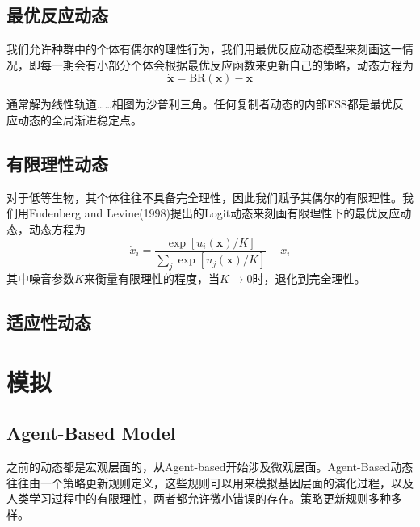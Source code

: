 \documentclass[lang=cn,12pt,a4paper]{elegantpaper}
\begin{document}
\subsection{最优反应动态}

我们允许种群中的个体有偶尔的理性行为，我们用最优反应动态模型来刻画这一情况，即每一期会有小部分个体会根据最优反应函数来更新自己的策略，动态方程为
\begin{equation}
\dot{\mathbf{x}}=\mathrm{BR}(\mathbf{x})-\mathbf{x}
\end{equation}

通常解为线性轨道……相图为沙普利三角。任何复制者动态的内部ESS都是最优反应动态的全局渐进稳定点。

\subsection{有限理性动态}

对于低等生物，其个体往往不具备完全理性，因此我们赋予其偶尔的有限理性。我们用Fudenberg and Levine(1998)提出的Logit动态来刻画有限理性下的最优反应动态，动态方程为
\begin{equation}
\dot{{x}}_{i}=\frac{\exp \left[u_{i}(\mathbf{x}) / K\right]}{\sum_{j} \exp \left[u_{j}(\mathbf{x}) / K\right]}-{x}_i
\end{equation}
其中噪音参数$K$来衡量有限理性的程度，当$K\rightarrow0$时，退化到完全理性。

\subsection{适应性动态}






\section{模拟}

\subsection{Agent-Based Model}

之前的动态都是宏观层面的，从Agent-based开始涉及微观层面。Agent-Based动态往往由一个策略更新规则定义，这些规则可以用来模拟基因层面的演化过程，以及人类学习过程中的有限理性，两者都允许微小错误的存在。策略更新规则多种多样。
\end{document}
